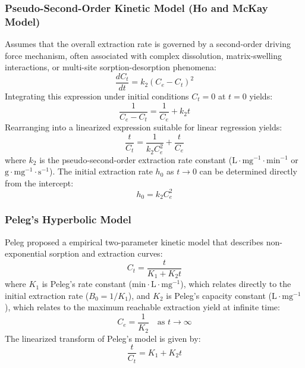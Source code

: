 \documentclass{article}
\begin{document}
\subsubsection{Pseudo-Second-Order Kinetic Model (Ho and McKay Model)}
Assumes that the overall extraction rate is governed by a second-order driving force mechanism, often associated with complex dissolution, matrix-swelling interactions, or multi-site sorption-desorption phenomena:
\begin{equation}
\frac{dC_t}{dt} = k_2 (C_e - C_t)^2
\end{equation}
Integrating this expression under initial conditions $C_t = 0$ at $t = 0$ yields:
\begin{equation}
\frac{1}{C_e - C_t} = \frac{1}{C_e} + k_2 t
\end{equation}
Rearranging into a linearized expression suitable for linear regression yields:
\begin{equation}
\frac{t}{C_t} = \frac{1}{k_2 C_e^2} + \frac{t}{C_e}
\end{equation}
where $k_2$ is the pseudo-second-order extraction rate constant ($\text{L}\cdot\text{mg}^{-1}\cdot\text{min}^{-1}$ or $\text{g}\cdot\text{mg}^{-1}\cdot\text{s}^{-1}$). The initial extraction rate $h_0$ as $t \to 0$ can be determined directly from the intercept:
\begin{equation}
h_0 = k_2 C_e^2
\end{equation}

\subsubsection{Peleg's Hyperbolic Model}
Peleg proposed a empirical two-parameter kinetic model that describes non-exponential sorption and extraction curves:
\begin{equation}
C_t = \frac{t}{K_1 + K_2 t}
\end{equation}
where $K_1$ is Peleg's rate constant ($\text{min}\cdot\text{L}\cdot\text{mg}^{-1}$), which relates directly to the initial extraction rate ($B_0 = 1/K_1$), and $K_2$ is Peleg's capacity constant ($\text{L}\cdot\text{mg}^{-1}$), which relates to the maximum reachable extraction yield at infinite time:
\begin{equation}
C_e = \frac{1}{K_2} \quad \text{as } t \to \infty
\end{equation}
The linearized transform of Peleg's model is given by:
\begin{equation}
\frac{t}{C_t} = K_1 + K_2 t
\end{equation}
\end{document}
